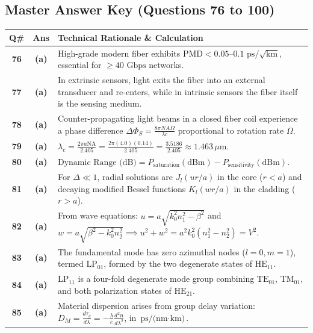 \newpage

\subsection*{Master Answer Key (Questions 76 to 100)}

{\small
\noindent\begin{tabularx}{\textwidth}{|c|c|X|}
\hline
\textbf{Q\#} & \textbf{Ans} & \textbf{Technical Rationale \& Calculation} \\
\hline
\textbf{76} & \textbf{(a)} & High-grade modern fiber exhibits $\text{PMD} < 0.05\text{--}0.1\text{ ps}/\sqrt{\text{km}}$, essential for $\ge 40\text{ Gbps}$ networks. \\ \hline
\textbf{77} & \textbf{(a)} & In extrinsic sensors, light exits the fiber into an external transducer and re-enters, while in intrinsic sensors the fiber itself is the sensing medium. \\ \hline
\textbf{78} & \textbf{(a)} & Counter-propagating light beams in a closed fiber coil experience a phase difference $\Delta\Phi_S = \frac{8\pi N A \Omega}{\lambda c}$ proportional to rotation rate $\Omega$. \\ \hline
\textbf{79} & \textbf{(a)} & $\lambda_c = \frac{2\pi a \text{NA}}{2.405} = \frac{2\pi (4.0)(0.14)}{2.405} = \frac{3.5186}{2.405} \approx 1.463\,\mu\text{m}$. \\ \hline
\textbf{80} & \textbf{(a)} & $\text{Dynamic Range (dB)} = P_{\text{saturation}}(\text{dBm}) - P_{\text{sensitivity}}(\text{dBm})$. \\ \hline
\textbf{81} & \textbf{(a)} & For $\Delta \ll 1$, radial solutions are $J_l(ur/a)$ in the core ($r < a$) and decaying modified Bessel functions $K_l(wr/a)$ in the cladding ($r > a$). \\ \hline
\textbf{82} & \textbf{(a)} & From wave equations: $u = a\sqrt{k_0^2 n_1^2 - \beta^2}$ and $w = a\sqrt{\beta^2 - k_0^2 n_2^2} \implies u^2 + w^2 = a^2 k_0^2(n_1^2 - n_2^2) = V^2$. \\ \hline
\textbf{83} & \textbf{(a)} & The fundamental mode has zero azimuthal nodes ($l=0, m=1$), termed $\text{LP}_{01}$, formed by the two degenerate states of $\text{HE}_{11}$. \\ \hline
\textbf{84} & \textbf{(a)} & $\text{LP}_{11}$ is a four-fold degenerate mode group combining $\text{TE}_{01}$, $\text{TM}_{01}$, and both polarization states of $\text{HE}_{21}$. \\ \hline
\textbf{85} & \textbf{(a)} & Material dispersion arises from group delay variation: $D_M = \frac{d\tau_g}{d\lambda} = -\frac{\lambda}{c}\frac{d^2 n}{d\lambda^2}$, in $\text{ps/(nm}\cdot\text{km)}$. \\ \hline

\end{tabularx}}
